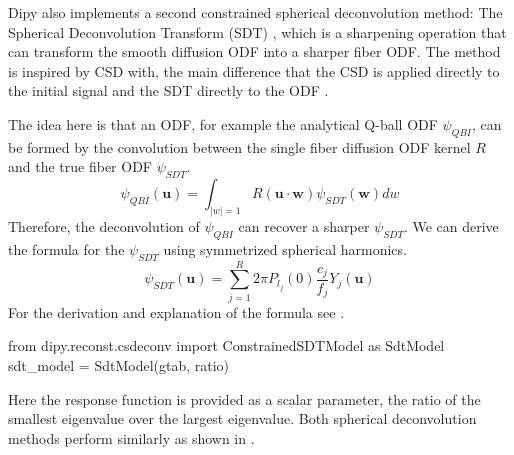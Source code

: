 \documentclass{bioinfo}
\begin{document}
Dipy also implements a second constrained spherical deconvolution method: The
Spherical Deconvolution Transform (SDT)
\citep{descoteaux-deriche-etal:09}, which is a sharpening
operation that can transform the smooth diffusion ODF into a sharper
fiber ODF. The method is
inspired by CSD \cite{tournier-calamante-etal:07} with, the main difference
that the CSD is applied directly to the initial signal and the SDT directly to
the ODF \citep{descoteaux:08,descoteaux-deriche-etal:09}.

The idea here is that an ODF, for example the analytical Q-ball ODF
$\psi_{QBI}$, can be formed by the convolution between the single fiber
diffusion ODF kernel $R$ and the true fiber ODF $\psi_{SDT}$.
\begin{equation}
\psi_{QBI}(\mathbf{u})=\displaystyle\int_{|w|=1} R(\mathbf{u} \cdot \mathbf{w}) \psi_{SDT}(\mathbf{w}) dw\label{eq:Conv}
\end{equation}
Therefore, the deconvolution of $\psi_{QBI}$ can recover a sharper
$\psi_{SDT}$. We can derive the formula for the $\psi_{SDT}$ using symmetrized
spherical harmonics.
\begin{equation}
\psi_{SDT}(\mathbf{u})=\displaystyle\sum_{j=1}^{R}2\pi P_{l_{j}}(0) \frac{c_j}{f_j}Y_{j}(\mathbf{u})\label{eq:ODF_SDT}
\end{equation}
For the derivation and explanation of the formula see \cite{descoteaux-deriche-etal:09}.
\begin{python}
from dipy.reconst.csdeconv import
        ConstrainedSDTModel as SdtModel
sdt_model = SdtModel(gtab, ratio)
\end{python}
Here the response function is provided as a scalar parameter, the ratio of the
smallest eigenvalue over the largest eigenvalue. Both spherical deconvolution
methods perform similarly as shown in
\citep{descoteaux-deriche-etal:09,GaryfallidisISBI2013a}.
\end{document}
